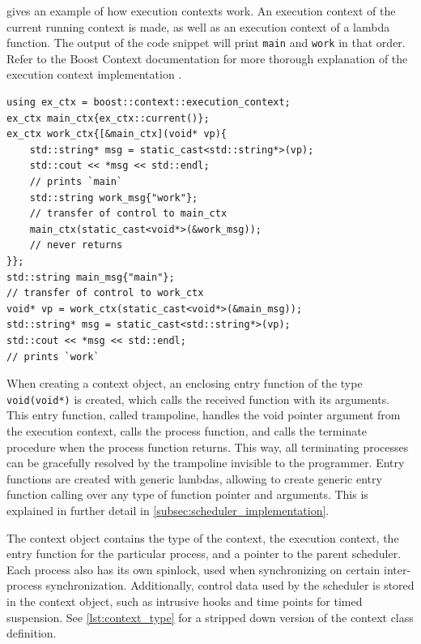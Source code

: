  gives an example of how execution contexts work. An execution context of the current running context is made, as well as an execution context of a lambda function. The output of the code snippet will print \texttt{main} and \texttt{work} in that order. Refer to the Boost Context documentation for more thorough explanation of the execution context implementation \citep{kowalke2017boost}.

\begin{lstfloat}
\begin{lstlisting}[caption={Transfer of control between execution contexts.}, label={lst:transfer_control_execution_contexts}, style={CustomC++}, xleftmargin={4em}]
using ex_ctx = boost::context::execution_context;
ex_ctx main_ctx{ex_ctx::current()};
ex_ctx work_ctx{[&main_ctx](void* vp){
    std::string* msg = static_cast<std::string*>(vp);
    std::cout << *msg << std::endl;
    // prints `main`
    std::string work_msg{"work"};
    // transfer of control to main_ctx
    main_ctx(static_cast<void*>(&work_msg));
    // never returns
}};
std::string main_msg{"main"};
// transfer of control to work_ctx
void* vp = work_ctx(static_cast<void*>(&main_msg));
std::string* msg = static_cast<std::string*>(vp);
std::cout << *msg << std::endl;
// prints `work`
\end{lstlisting}
\end{lstfloat}

When creating a context object, an enclosing entry function of the type \lstinline[style={CustomC++}]|void(void*)| is created, which calls the received function with its arguments. This entry function, called trampoline, handles the void pointer argument from the execution context, calls the process function, and calls the terminate procedure when the process function returns. This way, all terminating processes can be gracefully resolved by the trampoline invisible to the programmer. Entry functions are created with generic lambdas, allowing to create generic entry function calling over any type of function pointer and arguments. This is explained in further detail in \cref{subsec:scheduler_implementation}.

The context object contains the type of the context, the execution context, the entry function for the particular process, and a pointer to the parent scheduler. Each process also has its own spinlock, used when synchronizing on certain inter\hyp{}process synchronization. Additionally, control data used by the scheduler is stored in the context object, such as intrusive hooks and time points for timed suspension. See \cref{lst:context_type} for a stripped down version of the context class definition.

